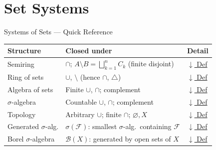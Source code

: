 \section{Set Systems}


\begin{toolkitbox}{Systems of Sets --- Quick Reference}
\small
\begin{tabular}{l l l}
\toprule
\textbf{Structure} & \textbf{Closed under} & \textbf{Detail} \\
\midrule
Semiring         & $\cap$;\; $A \setminus B = \bigsqcup_{k=1}^n C_k$ (finite disjoint)  & \hyperref[def:semiring-of-sets]{$\downarrow$ Def} \\
Ring of sets     & $\cup$,\; $\setminus$ (hence $\cap$, $\triangle$)                    & \hyperref[def:ring-of-setsxxx]{$\downarrow$ Def} \\
Algebra of sets  & Finite $\cup$, $\cap$; complement                                   & \hyperref[def:algebra-of-sets]{$\downarrow$ Def} \\
$\sigma$-algebra & Countable $\cup$, $\cap$; complement                                & \hyperref[def:sigma-algebra]{$\downarrow$ Def} \\
Topology         & Arbitrary $\cup$; finite $\cap$; $\varnothing, X$                   & \hyperref[def:topology-defn]{$\downarrow$ Def} \\
\midrule
Generated $\sigma$-alg. & $\sigma(\mathcal{F})$: smallest $\sigma$-alg.\ containing $\mathcal{F}$ & \hyperref[def:generated-sigma]{$\downarrow$ Def} \\
Borel $\sigma$-algebra  & $\mathcal{B}(X)$: generated by open sets of $X$                       & \hyperref[def:borel]{$\downarrow$ Def} \\
\bottomrule
\end{tabular}
\end{toolkitbox}


